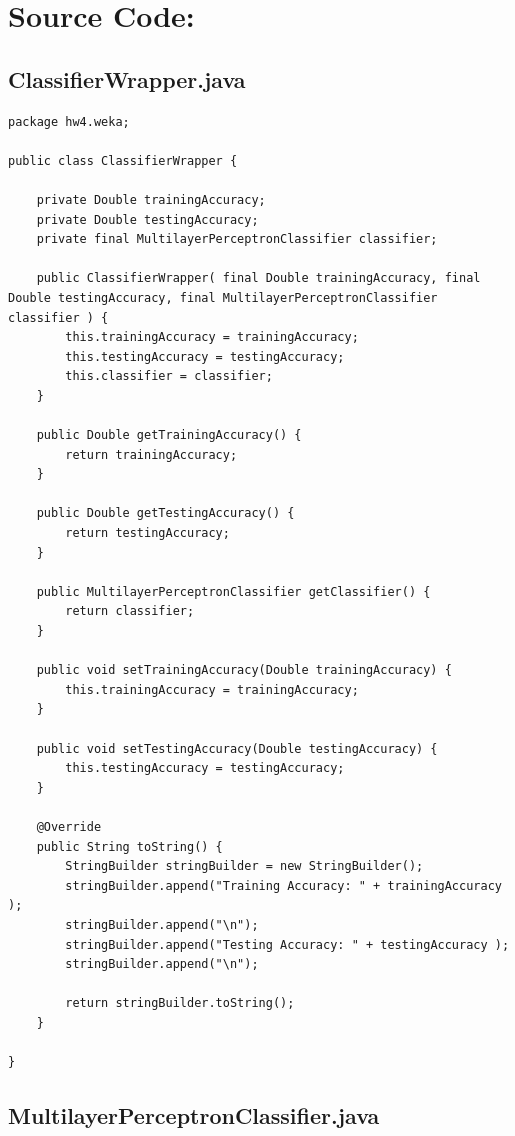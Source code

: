 \section{Source Code:}

\subsection{ClassifierWrapper.java}

\begin{lstlisting}
package hw4.weka;

public class ClassifierWrapper {
	
	private Double trainingAccuracy;
	private Double testingAccuracy;
	private final MultilayerPerceptronClassifier classifier;
	
	public ClassifierWrapper( final Double trainingAccuracy, final Double testingAccuracy, final MultilayerPerceptronClassifier classifier ) {
		this.trainingAccuracy = trainingAccuracy;
		this.testingAccuracy = testingAccuracy;
		this.classifier = classifier;
	}

	public Double getTrainingAccuracy() {
		return trainingAccuracy;
	}

	public Double getTestingAccuracy() {
		return testingAccuracy;
	}

	public MultilayerPerceptronClassifier getClassifier() {
		return classifier;
	}
	
	public void setTrainingAccuracy(Double trainingAccuracy) {
		this.trainingAccuracy = trainingAccuracy;
	}

	public void setTestingAccuracy(Double testingAccuracy) {
		this.testingAccuracy = testingAccuracy;
	}

	@Override
	public String toString() {
		StringBuilder stringBuilder = new StringBuilder();
		stringBuilder.append("Training Accuracy: " + trainingAccuracy );
		stringBuilder.append("\n");
		stringBuilder.append("Testing Accuracy: " + testingAccuracy );
		stringBuilder.append("\n");
		
		return stringBuilder.toString();
	}

}
\end{lstlisting}

\subsection{MultilayerPerceptronClassifier.java}


